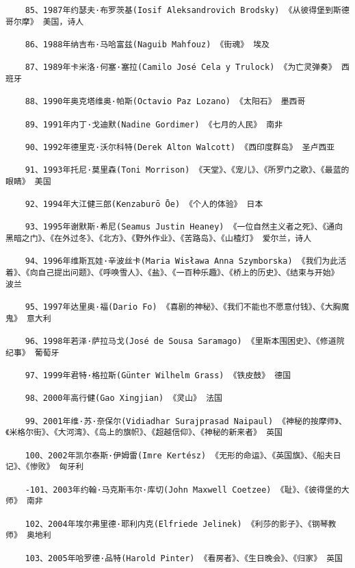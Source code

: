 \documentclass[UTF8]{../RepresentationUniverse}
\begin{document}
\begin{lstlisting}
    85、1987年约瑟夫·布罗茨基(Iosif Aleksandrovich Brodsky) 《从彼得堡到斯德哥尔摩》 美国，诗人
    
    86、1988年纳吉布·马哈富兹(Naguib Mahfouz) 《街魂》 埃及
    
    87、1989年卡米洛·何塞·塞拉(Camilo José Cela y Trulock) 《为亡灵弹奏》 西班牙
    
    88、1990年奥克塔维奥·帕斯(Octavio Paz Lozano) 《太阳石》 墨西哥
    
    89、1991年内丁·戈迪默(Nadine Gordimer) 《七月的人民》 南非
    
    90、1992年德里克·沃尔科特(Derek Alton Walcott) 《西印度群岛》 圣卢西亚
    
    91、1993年托尼·莫里森(Toni Morrison) 《天堂》、《宠儿》、《所罗门之歌》、《最蓝的眼睛》 美国
    
    92、1994年大江健三郎(Kenzaburō Ōe) 《个人的体验》 日本
    
    93、1995年谢默斯·希尼(Seamus Justin Heaney) 《一位自然主义者之死》、《通向黑暗之门》、《在外过冬》、《北方》、《野外作业》、《苦路岛》、《山楂灯》 爱尔兰，诗人
    
    94、1996年维斯瓦娃·辛波丝卡(Maria Wisława Anna Szymborska) 《我们为此活着》、《向自己提出问题》、《呼唤雪人》、《盐》、《一百种乐趣》、《桥上的历史》、《结束与开始》 波兰
    
    95、1997年达里奥·福(Dario Fo) 《喜剧的神秘》、《我们不能也不愿意付钱》、《大胸魔鬼》 意大利
    
    96、1998年若泽·萨拉马戈(José de Sousa Saramago) 《里斯本围困史》、《修道院纪事》 葡萄牙
    
    97、1999年君特·格拉斯(Günter Wilhelm Grass) 《铁皮鼓》 德国
    
    98、2000年高行健(Gao Xingjian) 《灵山》 法国
    
    99、2001年维·苏·奈保尔(Vidiadhar Surajprasad Naipaul) 《神秘的按摩师》、《米格尔街》、《大河湾》、《岛上的旗帜》、《超越信仰》、《神秘的新来者》 英国
    
    100、2002年凯尔泰斯·伊姆雷(Imre Kertész) 《无形的命运》、《英国旗》、《船夫日记》、《惨败》 匈牙利
    
    -101、2003年约翰·马克斯韦尔·库切(John Maxwell Coetzee) 《耻》、《彼得堡的大师》 南非
    
    102、2004年埃尔弗里德·耶利内克(Elfriede Jelinek) 《利莎的影子》、《钢琴教师》 奥地利
    
    103、2005年哈罗德·品特(Harold Pinter) 《看房者》、《生日晚会》、《归家》 英国
    

\end{lstlisting}
\end{document}
